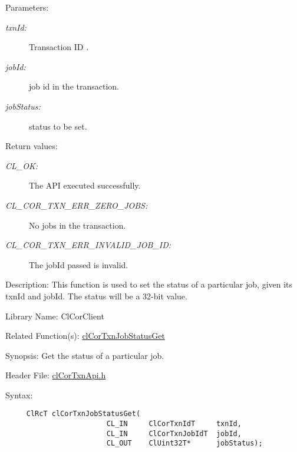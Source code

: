 \begin{Desc}
\item[Parameters:]
\begin{description}
\item[{\em txn\-Id:}]Transaction ID . \item[{\em job\-Id:}]job id in the transaction. \item[{\em job\-Status:}]status to be set.\end{description}
\end{Desc}
\begin{Desc}
\item[Return values:]
\begin{description}
\item[{\em CL\_\-OK:}]The API executed successfully. \item[{\em CL\_\-COR\_\-TXN\_\-ERR\_\-ZERO\_\-JOBS:}]No jobs in the transaction. \item[{\em CL\_\-COR\_\-TXN\_\-ERR\_\-INVALID\_\-JOB\_\-ID:}]The job\-Id passed is invalid.\end{description}
\end{Desc}
\begin{Desc}
\item[Description:]This function is used to set the status of a particular job, given its txn\-Id and job\-Id. The status will be a 32-bit value.\end{Desc}
\begin{Desc}
\item[Library Name:]Cl\-Cor\-Client\end{Desc}
\begin{Desc}
\item[Related Function(s): ]\hyperlink{group__group13_ga84}{cl\-Cor\-Txn\-Job\-Status\-Get}\end{Desc}
\begin{Desc}
\item[Synopsis:]Get the status of a particular job.\end{Desc}
\begin{Desc}
\item[Header File:]\hyperlink{cl_cor_txn_api_8h}{cl\-Cor\-Txn\-Api.h}\end{Desc}
\begin{Desc}
\item[Syntax:]

\footnotesize\begin{verbatim}     ClRcT clCorTxnJobStatusGet(
                        CL_IN     ClCorTxnIdT     txnId,
                        CL_IN     ClCorTxnJobIdT  jobId,
                        CL_OUT    ClUint32T*      jobStatus);
\end{verbatim}
\normalsize
\end{Desc}
